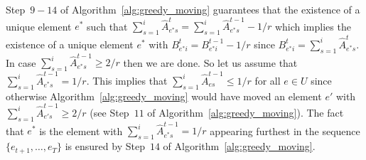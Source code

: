 \noindent Step~$9-14$ of Algorithm~\ref{alg:greedy_moving} guarantees that the existence of a unique element $e^\ast$ such that $\sum_{s=1}^i \hat{A}_{e^\ast s}^t = \sum_{s=1}^i \hat{A}_{e^\ast s}^{t-1} -1/r$ which implies the existence of a unique element $e^\ast$ with $B_{e^\ast i}^t =  B_{e^\ast i}^{t-1} - 1/r$ since $B_{e^\ast i}^t =\sum_{s=1}^i\hat{A}_{e^\ast s}^{t}$. In case $\sum_{s=1}^i \hat{A}_{e^\ast s}^{t-1} \geq 2/r$ then we are done. So let us assume that $\sum_{s=1}^i \hat{A}_{e^\ast s}^{t-1} = 1/r$. This implies that $\sum_{s=1}^i \hat{A}_{e s}^{t-1} \leq 1/r$ for all $e \in U$ since otherwise Algorithm~\ref{alg:greedy_moving} would have moved an element $e'$ with $\sum_{s=1}^i \hat{A}_{e' s}^{t-1} \geq 2/r$ (see Step~$11$ of Algorithm~\ref{alg:greedy_moving}). The fact that $e^\ast$ is the element with $\sum_{s=1}^i \hat{A}_{e^\ast s}^{t-1} = 1/r$ appearing furthest in the sequence $\{e_{t+1},\ldots,e_T\}$ is ensured by Step~$14$ of Algorithm~\ref{alg:greedy_moving}.



